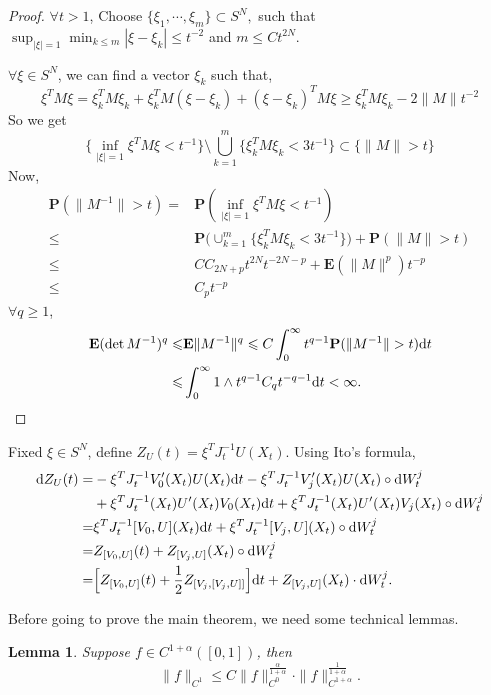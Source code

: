 \documentclass[twoside, 12pt]{book}
\numberwithin{equation}{chapter}
\newtheorem{lemma}[theorem]{Lemma}
\def\bE{{\mathbf E}}
\def\bP{{\mathbf P}}
\def\geq{\geqslant}
\def\leq{\leqslant}
\def\d{\text{\rm{d}}}
\begin{document}
	\begin{proof}
		$\forall t>1$, 
		Choose $\{\xi_1,\cdots, \xi_m\}\subset S^N,$ such that $\sup_{|\xi|=1}\min_{k\leq m} |\xi-\xi_k|\leq t^{-2}$ and $m\leq C t^{2N}$. 
		
		$\forall \xi\in S^N$, we can find a vector $\xi_k$ such that,  
		$$\xi^T M\xi = \xi_k^T M\xi_k +\xi_k^TM(\xi-\xi_k)+(\xi-\xi_k)^TM\xi\geq  \xi_k^T M\xi_k-2\|M\|t^{-2}$$
		So we get 
		$$\{\inf_{|\xi|=1} \xi^T M\xi<t^{-1}\}\setminus \bigcup_{k=1}^m \{\xi_k^T M\xi_k<3t^{-1}\}\subset \{ \|M\|>t\}$$
		Now, 
		\begin{equation*}
			\begin{split}
				\bP (\|M^{-1}\|>t)=&\bP  (\inf_{|\xi|=1} \xi^T M\xi<t^{-1})\\
				\leq &\bP \Big( \cup_{k=1}^m \{\xi_k^T M\xi_k<3t^{-1}\}\Big)+\bP (\|M\|>t)\\
				\leq& CC_{2N+p}t^{2N} t^{-2N-p}+\bE  (\|M\|^p)t^{-p}\\
				\leq & C_p t^{-p}
			\end{split}
		\end{equation*}
		$\forall q\geq 1$, 
		\begin{align*}
			\bE  (\det M^{-1})^q\leq& \bE \|M^{-1}\|^q\leq C \int_0^\infty t^{q-1} \bP (\|M^{-1}\|>t)\d t\\\leq& \int_0^\infty 1\wedge t^{q-1}C_{q}  t^{-q-1}\d t<\infty. 
		\end{align*}
	\end{proof}
	
	Fixed $\xi\in S^N$, define $Z_U(t)=\xi^T J_t^{-1}U(X_t)$. 
	Using Ito's formula, 
	\begin{equation}
		\begin{split}
			\d Z_U(t)=&-\xi^T J_t^{-1}V'_0(X_t)U(X_t) \d t- \xi^T J_t^{-1}V'_j(X_t) U(X_t) \circ \d W^j_t\\
			&+\xi^T J_t^{-1}(X_t) U'(X_t)V_0(X_t)\d t+\xi^T J_t^{-1}(X_t) U'(X_t) V_j(X_t)\circ\d W^j_t\\
			=& \xi^T J_t^{-1} [V_0, U](X_t)\d t+\xi^T J_t^{-1} [V_j, U](X_t)\circ\d W^j_t\\
			=& Z_{[V_0, U]}(t)+ Z_{[V_j, U]}(X_t)\circ \d W_t^j\\
			=& \Big[Z_{[V_0, U]}(t)+\frac{1}{2} Z_{[V_j, [V_j, U]]}\Big]\d t+ Z_{[V_j, U]}(X_t) \cdot \d W_t^j.
		\end{split}
	\end{equation}
	
	Before going to prove the main theorem, we need some technical lemmas. 
	\begin{lemma}\label{Inter}
	Suppose $f\in C^{1+\alpha }([0,1])$, then 
	$$\|f\|_{C^1}\leq  C \|f\|_{C^0}^{\frac{\alpha }{1+\alpha }}\cdot \|f\|_{C^{1+\alpha }}^{\frac{1}{1+\alpha }}. $$
	\end{lemma}
	
\end{document}
